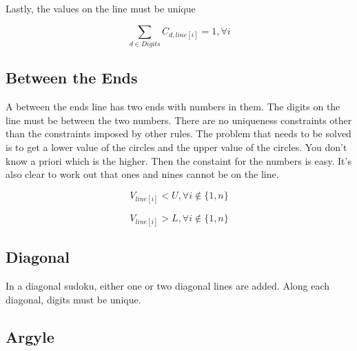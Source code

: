 \documentclass{article}
\begin{document}
Lastly, the values on the line must be unique

\begin{equation}
\sum_{d \in Digits} C_{d,line[i]} = 1, \forall i 
\end{equation}



\subsection{Between the Ends}

A between the ends line has two ends with numbers in them.  The digits on the line must be between the two numbers. There are no uniqueness constraints other than the constraints imposed
by other rules.  The problem that needs to be solved is to get a lower value of the circles and the upper value of the circles. You don't know a priori which is the higher. Then the constaint for the 
numbers is easy.  It's also clear to work out that ones and nines cannot be on the line. 

\begin{equation}
V_{line[i]} < U, \forall i \notin \lbrace 1, n \rbrace
\end{equation}

\begin{equation}
V_{line[i]} > L, \forall i \notin \lbrace 1, n \rbrace
\end{equation}


\subsection{Diagonal}

In a diagonal sudoku, either one or two diagonal lines are added. Along each diagonal, digits must be unique. 




\subsection{Argyle}


\end{document}
